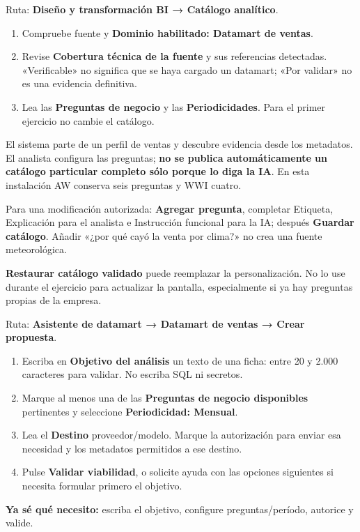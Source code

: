 Ruta: \textbf{Diseño y transformación BI → Catálogo analítico}.
\begin{enumerate}
\item Compruebe fuente y \textbf{Dominio habilitado: Datamart de ventas}.
\item Revise \textbf{Cobertura técnica de la fuente} y sus referencias detectadas. «Verificable» no significa que se haya cargado un datamart; «Por validar» no es una evidencia definitiva.
\item Lea las \textbf{Preguntas de negocio} y las \textbf{Periodicidades}. Para el primer ejercicio no cambie el catálogo.
\end{enumerate}
El sistema parte de un perfil de ventas y descubre evidencia desde los metadatos. El analista configura las preguntas; \textbf{no se publica automáticamente un catálogo particular completo sólo porque lo diga la IA}. En esta instalación AW conserva seis preguntas y WWI cuatro.

Para una modificación autorizada: \textbf{Agregar pregunta}, completar Etiqueta, Explicación para el analista e Instrucción funcional para la IA; después \textbf{Guardar catálogo}. Añadir «¿por qué cayó la venta por clima?» no crea una fuente meteorológica.
\begin{note}
\textbf{Restaurar catálogo validado} puede reemplazar la personalización. No lo use durante el ejercicio para actualizar la pantalla, especialmente si ya hay preguntas propias de la empresa.
\end{note}

Ruta: \textbf{Asistente de datamart → Datamart de ventas → Crear propuesta}.
\begin{enumerate}
\item Escriba en \textbf{Objetivo del análisis} un texto de una ficha: entre 20 y 2.000 caracteres para validar. No escriba SQL ni secretos.
\item Marque al menos una de las \textbf{Preguntas de negocio disponibles} pertinentes y seleccione \textbf{Periodicidad: Mensual}.
\item Lea el \textbf{Destino} proveedor/modelo. Marque la autorización para enviar esa necesidad y los metadatos permitidos a ese destino.
\item Pulse \textbf{Validar viabilidad}, o solicite ayuda con las opciones siguientes si necesita formular primero el objetivo.
\end{enumerate}
\textbf{Ya sé qué necesito:} escriba el objetivo, configure preguntas/período, autorice y valide.

